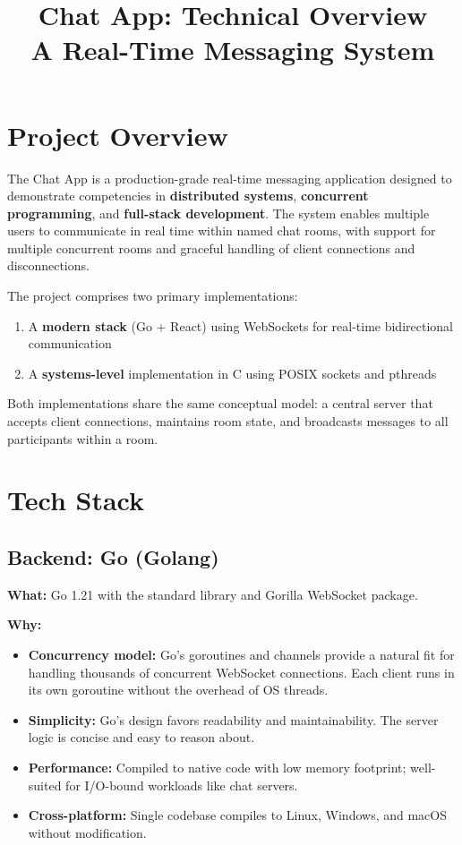 \documentclass[11pt,a4paper]{article}
\title{\textbf{Chat App: Technical Overview} \\ \large A Real-Time Messaging System}
\author{}
\date{}
\begin{document}
\maketitle
\tableofcontents
\newpage

\section{Project Overview}

The Chat App is a production-grade real-time messaging application designed to demonstrate competencies in \textbf{distributed systems}, \textbf{concurrent programming}, and \textbf{full-stack development}. The system enables multiple users to communicate in real time within named chat rooms, with support for multiple concurrent rooms and graceful handling of client connections and disconnections.

The project comprises two primary implementations:
\begin{enumerate}
    \item A \textbf{modern stack} (Go + React) using WebSockets for real-time bidirectional communication
    \item A \textbf{systems-level} implementation in C using POSIX sockets and pthreads
\end{enumerate}

Both implementations share the same conceptual model: a central server that accepts client connections, maintains room state, and broadcasts messages to all participants within a room.

\section{Tech Stack}

\subsection{Backend: Go (Golang)}

\textbf{What:} Go 1.21 with the standard library and Gorilla WebSocket package.

\textbf{Why:}
\begin{itemize}
    \item \textbf{Concurrency model:} Go's goroutines and channels provide a natural fit for handling thousands of concurrent WebSocket connections. Each client runs in its own goroutine without the overhead of OS threads.
    \item \textbf{Simplicity:} Go's design favors readability and maintainability. The server logic is concise and easy to reason about.
    \item \textbf{Performance:} Compiled to native code with low memory footprint; well-suited for I/O-bound workloads like chat servers.
    \item \textbf{Cross-platform:} Single codebase compiles to Linux, Windows, and macOS without modification.
\end{itemize}
\end{document}
